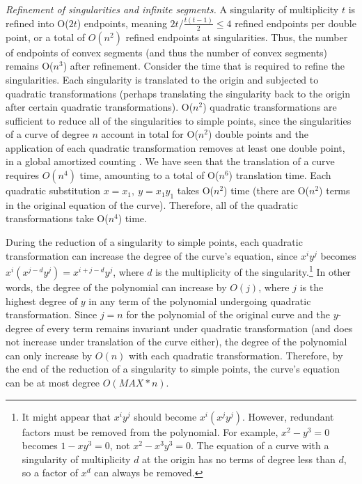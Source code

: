 {\em Refinement of singularities and infinite segments.}
%
A singularity of multiplicity $t$ is refined into O($2t$) endpoints, meaning
$2t / \frac{t(t-1)}{2} \leq 4$ refined endpoints per double point,
or a total of $O(n^{2})$ refined endpoints at singularities.
Thus, the number of endpoints of convex segments 
(and thus the number of convex segments) remains O($n^{3}$) after refinement.
Consider the time that is required to refine the singularities.
Each singularity is translated to the origin and subjected to quadratic transformations
(perhaps translating the singularity back to the origin after certain quadratic 
transformations).
O($n^{2}$) quadratic transformations are sufficient to reduce all of the singularities 
to simple points, since the singularities of a curve of degree $n$ account in total for 
O($n^{2}$) double points and the application of each quadratic transformation 
removes at least one double point, in a global amortized counting \cite{abba3}. 
We have seen that the translation of a curve requires $O(n^{4})$ time, 
amounting to a total of O($n^{6}$) translation time. 
Each quadratic substitution $x = x_{1},\ y = x_{1}y_{1}$ takes O($n^{2}$) time 
(there are O($n^2$) terms in the original equation of the curve).
Therefore, all of the quadratic transformations take O($n^{4}$) time.

During the reduction of a singularity to simple points, each quadratic
transformation can increase the degree of the curve's equation, since
$x^{i}y^{j}$ becomes $x^{i}(x^{j-d}y^{j}) = x^{i+j-d}y^{j}$, where $d$ is the 
multiplicity of the singularity.\footnote{It might appear that 
	$x^{i}y^{j}$ should become $x^{i}(x^{j}y^{j})$.  However,  
	redundant factors must be removed from the polynomial.
	For example, $x^{2} - y^{3} = 0$
	becomes $1-xy^{3} = 0$, not $x^{2} - x^{3}y^{3} = 0$.
	The equation of a curve with a singularity of multiplicity $d$ 
	at the origin has no terms of degree less than $d$, so a factor of $x^{d}$ can
	always be removed.}
In other words, the degree of the polynomial can increase by $O(j)$, where
$j$ is the highest degree of $y$ in any term of the polynomial undergoing 
quadratic transformation. 
Since $j=n$ for the polynomial of the original curve and the $y$-degree of every term
remains invariant under quadratic transformation (and does not increase under
translation of the curve either), the degree of the polynomial can only increase
by $O(n)$ with each quadratic transformation.
Therefore, by the end of the reduction of a singularity to simple points, 
the curve's equation can be at most degree $O(MAX * n)$.

